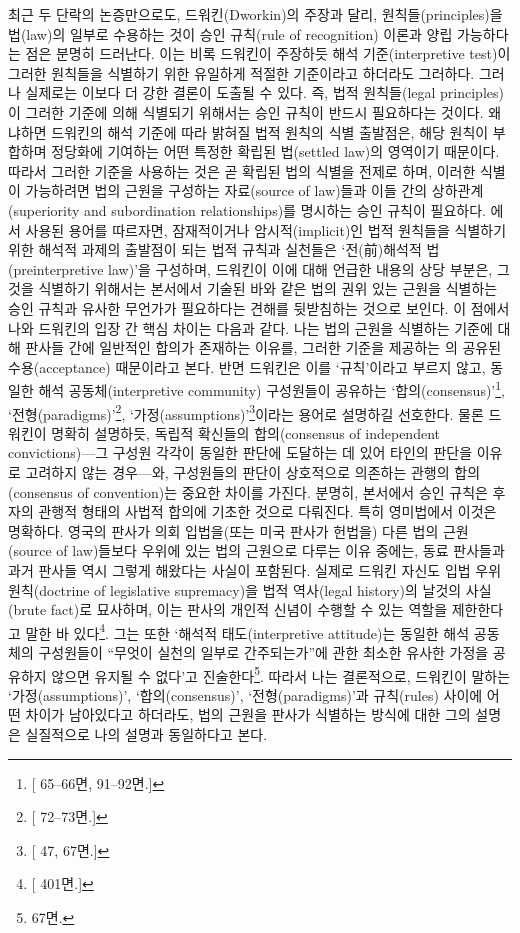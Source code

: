 최근 두 단락의 논증만으로도, 드워킨(Dworkin)의 주장과 달리,
원칙들(principles)을 법(law)의 일부로 수용하는 것이 승인 규칙(rule of
recognition) 이론과 양립 가능하다는 점은 분명히 드러난다. 이는 비록
드워킨이 주장하듯 해석 기준(interpretive test)이 그러한 원칙들을
식별하기 위한 유일하게 적절한 기준이라고 하더라도 그러하다. 그러나
실제로는 이보다 더 강한 결론이 도출될 수 있다. 즉, 법적 원칙들(legal
principles)이 그러한 기준에 의해 식별되기 위해서는 승인 규칙이 반드시
필요하다는 것이다. 왜냐하면 드워킨의 해석 기준에 따라 밝혀질 법적 원칙의
식별 출발점은, 해당 원칙이 부합하며 정당화에 기여하는 어떤 특정한 확립된
법(settled law)의 영역이기 때문이다. 따라서 그러한 기준을 사용하는 것은
곧 확립된 법의 식별을 전제로 하며, 이러한 식별이 가능하려면 법의 근원을
구성하는 자료(source of law)들과 이들 간의 상하관계(superiority and
subordination relationships)를 명시하는 승인 규칙이 필요하다.
에서 사용된 용어를 따르자면, 잠재적이거나
암시적(implicit)인 법적 원칙들을 식별하기 위한 해석적 과제의 출발점이
되는 법적 규칙과 실천들은 `전(前)해석적 법(preinterpretive law)'을
구성하며, 드워킨이 이에 대해 언급한 내용의 상당 부분은, 그것을 식별하기
위해서는 본서에서 기술된 바와 같은 법의 권위 있는 근원을 식별하는 승인
규칙과 유사한 무언가가 필요하다는 견해를 뒷받침하는 것으로 보인다. 이
점에서 나와 드워킨의 입장 간 핵심 차이는 다음과 같다. 나는 법의 근원을
식별하는 기준에 대해 판사들 간에 일반적인 합의가 존재하는 이유를, 그러한
기준을 제공하는 의 공유된 수용(acceptance)
때문이라고 본다. 반면 드워킨은 이를 `규칙'이라고 부르지 않고, 동일한
해석 공동체(interpretive community) 구성원들이 공유하는
`합의(consensus)'\footnote{{[} 65--66면, 91--92면.{]}},
`전형(paradigms)'\footnote{{[} 72--73면.{]}},
`가정(assumptions)'\footnote{{[} 47, 67면.{]}}이라는 용어로
설명하길 선호한다. 물론 드워킨이 명확히 설명하듯, 독립적 확신들의
합의(consensus of independent convictions)---그 구성원 각각이 동일한
판단에 도달하는 데 있어 타인의 판단을 이유로 고려하지 않는 경우---와,
구성원들의 판단이 상호적으로 의존하는 관행의 합의(consensus of
convention)는 중요한 차이를 가진다. 분명히, 본서에서 승인 규칙은 후자의
관행적 형태의 사법적 합의에 기초한 것으로 다뤄진다. 특히 영미법에서
이것은 명확하다. 영국의 판사가 의회 입법을(또는 미국 판사가 헌법을) 다른
법의 근원(source of law)들보다 우위에 있는 법의 근원으로 다루는 이유
중에는, 동료 판사들과 과거 판사들 역시 그렇게 해왔다는 사실이 포함된다.
실제로 드워킨 자신도 입법 우위 원칙(doctrine of legislative supremacy)을
법적 역사(legal history)의 날것의 사실(brute fact)로 묘사하며, 이는
판사의 개인적 신념이 수행할 수 있는 역할을 제한한다고 말한 바
있다\footnote{{[} 401면.{]}}. 그는 또한 `해석적
태도(interpretive attitude)는 동일한 해석 공동체의 구성원들이 ``무엇이
실천의 일부로 간주되는가''에 관한 최소한 유사한 가정을 공유하지 않으면
유지될 수 없다'고 진술한다\footnote{ 67면.}. 따라서 나는
결론적으로, 드워킨이 말하는 `가정(assumptions)', `합의(consensus)',
`전형(paradigms)'과 규칙(rules) 사이에 어떤 차이가 남아있다고 하더라도,
법의 근원을 판사가 식별하는 방식에 대한 그의 설명은 실질적으로 나의
설명과 동일하다고 본다.


